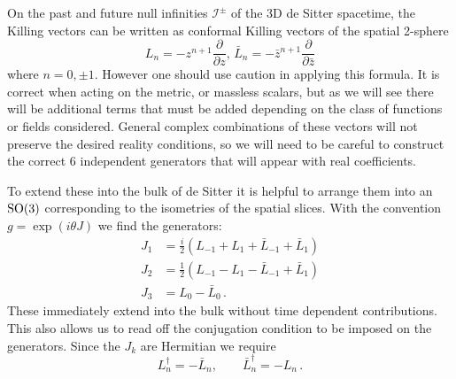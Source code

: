 \documentclass{brownthesis}
\begin{document}
On the past and future null infinities $\mathcal{I^{\pm}}$ of the
3D de Sitter spacetime, the Killing vectors can be written as conformal
Killing vectors of the spatial 2-sphere
\[
L_{n}=-z^{n+1}\frac{\partial}{\partial z},\,\bar{L}_{n}=-\bar{z}^{n+1}\frac{\partial}{\partial\bar{z}}
\]
where $n=0,\pm1$. However one should use caution in applying this
formula. It is correct when acting on the metric, or massless scalars,
but as we will see there will be additional terms that must be added
depending on the class of functions or fields considered. General
complex combinations of these vectors will not preserve the desired
reality conditions, so we will need to be careful to construct the
correct 6 independent generators that will appear with real coefficients.

To extend these into the bulk of de Sitter it is helpful to arrange
them into an ${\rm SO(3)}$ corresponding to the isometries of the
spatial slices. With the convention $g=\exp(i\theta J)$ we find the
generators:
\begin{align*}
J_{1} & =\frac{i}{2}\left(L_{-1}+L_{1}+\bar{L}_{-1}+\bar{L}_{1}\right)\\
J_{2} & =\frac{1}{2}\left(L_{-1}-L_{1}-\bar{L}_{-1}+\bar{L}_{1}\right)\\
J_{3} & =L_{0}-\bar{L}_{0}\,.
\end{align*}
These immediately extend into the bulk without time dependent contributions.
This also allows us to read off the conjugation condition to be imposed
on the generators. Since the $J_{k}$ are Hermitian we require
\[
L_{n}^{\dagger}=-\bar{L}_{n},\qquad\bar{L}_{n}^{\dagger}=-L_{n}\,.
\]
\end{document}
